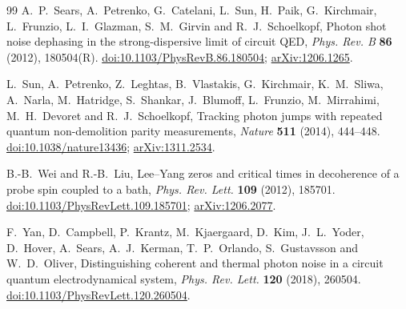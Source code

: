 \documentclass[11pt,reqno]{amsart}
\numberwithin{equation}{section}
\theoremstyle{plain}
\theoremstyle{definition}
\theoremstyle{remark}
\begin{document}
\begin{thebibliography}{99}
A.~P.~Sears, A.~Petrenko, G.~Catelani, L.~Sun, H.~Paik, G.~Kirchmair, L.~Frunzio, L.~I.~Glazman, S.~M.~Girvin and R.~J.~Schoelkopf, Photon shot noise dephasing in the strong-dispersive limit of circuit QED, \emph{Phys. Rev. B} \textbf{86} (2012), 180504(R).
\href{https://doi.org/10.1103/PhysRevB.86.180504}{doi:10.1103/PhysRevB.86.180504};
\href{https://arxiv.org/abs/1206.1265}{arXiv:1206.1265}.

L.~Sun, A.~Petrenko, Z.~Leghtas, B.~Vlastakis, G.~Kirchmair, K.~M.~Sliwa, A.~Narla, M.~Hatridge, S.~Shankar, J.~Blumoff, L.~Frunzio, M.~Mirrahimi, M.~H.~Devoret and R.~J.~Schoelkopf, Tracking photon jumps with repeated quantum non-demolition parity measurements, \emph{Nature} \textbf{511} (2014), 444--448.
\href{https://doi.org/10.1038/nature13436}{doi:10.1038/nature13436};
\href{https://arxiv.org/abs/1311.2534}{arXiv:1311.2534}.


B.-B.~Wei and R.-B.~Liu, Lee--Yang zeros and critical times in decoherence of a probe spin coupled to a bath, \emph{Phys. Rev. Lett.} \textbf{109} (2012), 185701.
\href{https://doi.org/10.1103/PhysRevLett.109.185701}{doi:10.1103/PhysRevLett.109.185701};
\href{https://arxiv.org/abs/1206.2077}{arXiv:1206.2077}.

F.~Yan, D.~Campbell, P.~Krantz, M.~Kjaergaard, D.~Kim, J.~L.~Yoder, D.~Hover, A.~Sears, A.~J.~Kerman, T.~P.~Orlando, S.~Gustavsson and W.~D.~Oliver, Distinguishing coherent and thermal photon noise in a circuit quantum electrodynamical system, \emph{Phys. Rev. Lett.} \textbf{120} (2018), 260504.
\href{https://doi.org/10.1103/PhysRevLett.120.260504}{doi:10.1103/PhysRevLett.120.260504}.

\end{thebibliography}
\end{document}
